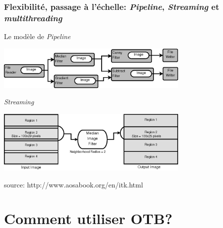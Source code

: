\documentclass[8pt]{beamer}
\begin{document}
\begin{frame}
\frametitle{Flexibilité, passage à l'échelle: \textit{Pipeline}, \textit{Streaming} et \textit{multithreading}}

\begin{block}{Le modèle de \textit{Pipeline}}
\begin{center}
\includegraphics[width=0.7\textwidth]{images/ProcessObjectDataObject.png}
\end{center}
\end{block}
\vspace{-0.5cm}
\begin{block}{\textit{Streaming}}
\begin{center}
\includegraphics[width=0.7\textwidth]{images/StreamingImageDiagram.png}
\end{center}
\end{block}
\vspace{-0.5cm}
\begin{center}
\tiny{source: http://www.aosabook.org/en/itk.html}
\end{center}
\end{frame}

\section{Comment utiliser OTB?}
\end{document}
